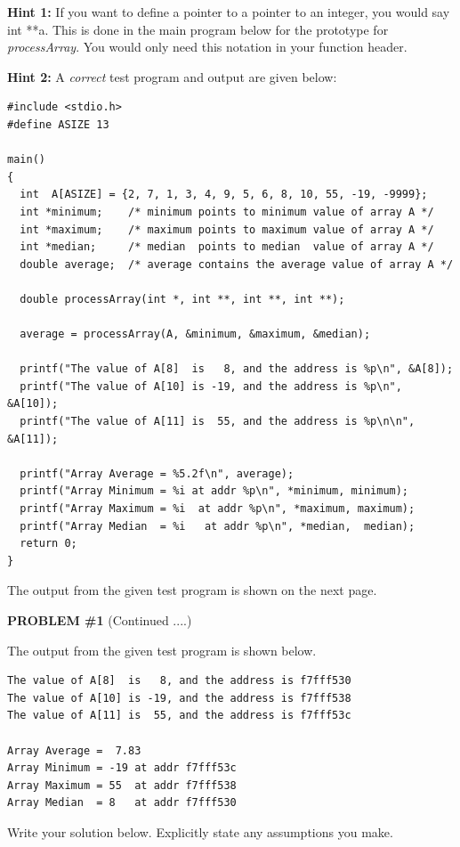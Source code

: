 {\bf Hint 1:}  If you want to define a pointer to a pointer to an
integer, you would say int **a.  This is done in the main program
below for the prototype for {\em processArray}.  You would only need
this notation in your function header.
 
{\bf Hint 2:} A {\em correct} test program and output are given below:
\begin{verbatim}
#include <stdio.h>
#define ASIZE 13

main()
{
  int  A[ASIZE] = {2, 7, 1, 3, 4, 9, 5, 6, 8, 10, 55, -19, -9999};
  int *minimum;    /* minimum points to minimum value of array A */ 
  int *maximum;    /* maximum points to maximum value of array A */ 
  int *median;     /* median  points to median  value of array A */ 
  double average;  /* average contains the average value of array A */ 

  double processArray(int *, int **, int **, int **);   

  average = processArray(A, &minimum, &maximum, &median);

  printf("The value of A[8]  is   8, and the address is %p\n", &A[8]);
  printf("The value of A[10] is -19, and the address is %p\n", &A[10]);
  printf("The value of A[11] is  55, and the address is %p\n\n", &A[11]);

  printf("Array Average = %5.2f\n", average);
  printf("Array Minimum = %i at addr %p\n", *minimum, minimum);
  printf("Array Maximum = %i  at addr %p\n", *maximum, maximum);
  printf("Array Median  = %i   at addr %p\n", *median,  median);
  return 0;
}
\end{verbatim}

The output from the given test program is shown on the next page.

\pagebreak
{\bf PROBLEM \#1} (Continued ....)

The output from the given test program is shown below.
\begin{verbatim}
The value of A[8]  is   8, and the address is f7fff530
The value of A[10] is -19, and the address is f7fff538
The value of A[11] is  55, and the address is f7fff53c
 
Array Average =  7.83
Array Minimum = -19 at addr f7fff53c
Array Maximum = 55  at addr f7fff538
Array Median  = 8   at addr f7fff530
\end{verbatim}

Write your solution below.  Explicitly state any assumptions you make.

